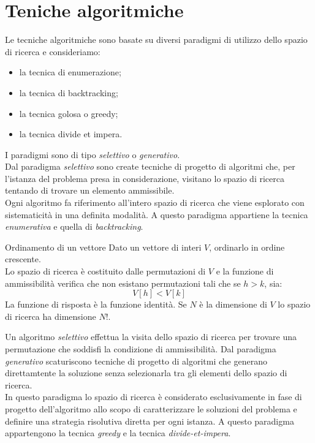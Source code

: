 \documentclass[12pt]{report}
\newcommand{\nmu}{}
\begin{document}
 	\section{Teniche algoritmiche}
 	Le tecniche algoritmiche sono basate su diversi paradigmi di utilizzo dello spazio di ricerca e consideriamo:
 	\begin{itemize}
 		\item la tecnica di enumerazione;
 		\item la tecnica di backtracking;
 		\item la tecnica golosa o greedy;
 		\item la tecnica divide et impera.
 	\end{itemize}
 	I paradigmi sono di tipo \textit{selettivo} o \textit{generativo}. \\
 	Dal paradigma \textit{selettivo} sono create tecniche di progetto di algoritmi che, per l'istanza del problema presa in considerazione, visitano lo spazio di ricerca tentando di trovare un elemento ammissibile. \\
 	Ogni algoritmo fa riferimento all'intero spazio di ricerca che viene esplorato con sistematicità in una definita modalità. A questo paradigma appartiene la tecnica \textit{enumerativa} e quella di \textit{backtracking}. \\
 	\begin{example}{\nmu Ordinamento di un vettore}{}
 		Dato un vettore di interi $V$, ordinarlo in ordine crescente. \\
 		Lo spazio di ricerca è costituito dalle permutazioni di $V$ e la funzione di ammissibilità verifica che non esistano permutazioni tali che se $h > k$, sia:
 		\[
 		V[h] < V[k]
 		\]
 		La funzione di risposta è la funzione identità. Se $N$ è la dimensione di $V$ lo spazio di ricerca ha dimensione $N!$.
 	\end{example}
 	Un algoritmo \textit{selettivo} effettua la visita dello spazio di ricerca per trovare una permutazione che soddisfi la condizione di ammissibilità.
 	Dal paradigma \textit{generativo} scaturiscono tecniche di progetto di algoritmi che generano direttamtente la soluzione senza selezionarla tra gli elementi dello spazio di ricerca. \\
 	In questo paradigma lo spazio di ricerca è considerato esclusivamente in fase di progetto dell'algoritmo allo scopo di caratterizzare le soluzioni del problema e definire una strategia risolutiva diretta per ogni istanza. A questo paradigma appartengono la tecnica \textit{greedy} e la tecnica \textit{divide-et-impera}. \\
\end{document}
